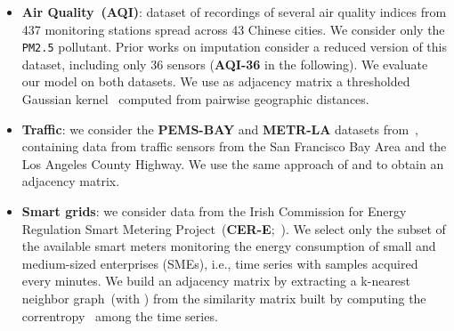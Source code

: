 \documentclass{article} \usepackage{iclr2022_conference,times}
\begin{document}
\begin{itemize}
    \item \textbf{Air Quality~(AQI)}: dataset of recordings of several air quality indices from 437 monitoring stations spread across 43 Chinese cities. We consider only the \texttt{PM2.5} pollutant. Prior works on imputation \citep{yi2016stmvl, cao2018brits} consider a reduced version of this dataset, including only 36 sensors (\textbf{AQI-36} in the following). We evaluate our model on both datasets. We use as adjacency matrix a thresholded Gaussian kernel~\citep{shuman2013emerging} computed from pairwise geographic distances.
    \item \textbf{Traffic}: we consider the \textbf{PEMS-BAY} and \textbf{METR-LA} datasets from~\citet{li2018diffusion}, containing data from traffic sensors from the San Francisco Bay Area and the Los Angeles County Highway. We use the same approach of \citet{li2018diffusion} and \citet{wu2019graph} to obtain an adjacency matrix.
    \item \textbf{Smart grids}: we consider data from the Irish Commission for Energy Regulation Smart Metering Project~(\textbf{CER-E};~\citealp{cer2016cer}). We select only the subset of the available smart meters monitoring the energy consumption of small and medium-sized enterprises (SMEs), i.e.,  time series with samples acquired every  minutes. We build an adjacency matrix by extracting a k-nearest neighbor graph~(with ) from the similarity matrix built by computing the correntropy~\citep{liu2007correntropy} among the time series.
\end{itemize}
\end{document}
